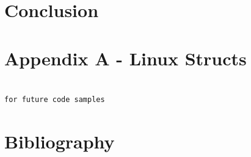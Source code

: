 \documentclass{article} %
\begin{document}
\section{Conclusion}

\clearpage
\section{Appendix A - Linux Structs}

\begin{lstlisting}

for future code samples

\end{lstlisting}

\section{Bibliography}


\end{document}
